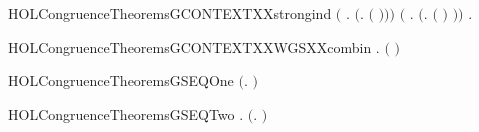 \begin{SaveVerbatim}{HOLCongruenceTheoremsGCONTEXTXXstrongind}
       \ensuremath{(}\HOLSymConst{\HOLTokenForall{}} .
              \HOLSymConst{\HOLTokenConj{}}   \HOLSymConst{\HOLTokenImp{}}
             \ensuremath{(}\HOLTokenLambda{}.   \ensuremath{(} \ensuremath{)}\ensuremath{)}\ensuremath{)} \HOLSymConst{\HOLTokenConj{}}
       \ensuremath{(}\HOLSymConst{\HOLTokenForall{}} .
              \HOLSymConst{\HOLTokenConj{}}   \HOLSymConst{\HOLTokenImp{}}
             \ensuremath{(}\HOLTokenLambda{}.  \ensuremath{(} \ensuremath{)} \ensuremath{)}\ensuremath{)} \HOLSymConst{\HOLTokenImp{}}
       \HOLSymConst{\HOLTokenForall{}}.   \HOLSymConst{\HOLTokenImp{}}  
\end{SaveVerbatim}
\newcommand{\HOLCongruenceTheoremsGCONTEXTXXstrongind}{\UseVerbatim{HOLCongruenceTheoremsGCONTEXTXXstrongind}}
\begin{SaveVerbatim}{HOLCongruenceTheoremsGCONTEXTXXWGSXXcombin}
\HOLTokenTurnstile{} \HOLSymConst{\HOLTokenForall{}} .   \HOLSymConst{\HOLTokenConj{}}   \HOLSymConst{\HOLTokenImp{}}  \ensuremath{(} \HOLConst{\HOLTokenCompose} \ensuremath{)}
\end{SaveVerbatim}
\newcommand{\HOLCongruenceTheoremsGCONTEXTXXWGSXXcombin}{\UseVerbatim{HOLCongruenceTheoremsGCONTEXTXXWGSXXcombin}}
\begin{SaveVerbatim}{HOLCongruenceTheoremsGSEQOne}
\HOLTokenTurnstile{}  \ensuremath{(}\HOLTokenLambda{}. \ensuremath{)}
\end{SaveVerbatim}
\newcommand{\HOLCongruenceTheoremsGSEQOne}{\UseVerbatim{HOLCongruenceTheoremsGSEQOne}}
\begin{SaveVerbatim}{HOLCongruenceTheoremsGSEQTwo}
\HOLTokenTurnstile{} \HOLSymConst{\HOLTokenForall{}}.  \ensuremath{(}\HOLTokenLambda{}. \ensuremath{)}
\end{SaveVerbatim}
